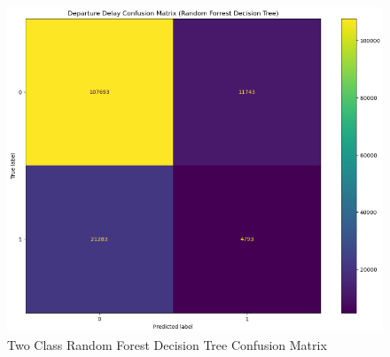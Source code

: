 \documentclass[a4paper,12pt]{article}
\begin{document}
\begin{figure}[!]
    \centering
    \includegraphics*[scale=.50]{../../img/model_rq2_cfmtrx_3.png}
    \caption[]{Two Class Random Forest Decision Tree Confusion Matrix}
    \label{fig:model:rq2:cfmtrx_3}
\end{figure}
\end{document}
